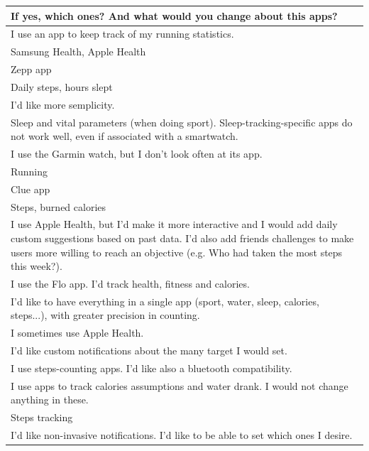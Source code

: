 \documentclass{article}
\begin{document}
\begin{table}[H]
    \centering
    \begin{tabularx}{0.9\textwidth}{X}
        \hline
        \textbf{If yes, which ones? And what would you change about this apps?} \\
        \hline
        I use an app to keep track of my running statistics. \\
        \hline
        Samsung Health, Apple Health \\
        \hline
        Zepp app \\
        \hline
        Daily steps, hours slept \\
        \hline
        I'd like more semplicity. \\
        \hline
        Sleep and vital parameters (when doing sport). Sleep-tracking-specific apps do not work well, even if associated with a smartwatch. \\
        \hline
        I use the Garmin watch, but I don't look often at its app. \\
        \hline
        Running \\
        \hline
        Clue app \\
        \hline
        Steps, burned calories \\
        \hline
        I use Apple Health, but I'd make it more interactive and I would add daily custom suggestions based on past data. I'd also add friends challenges to make users more willing to reach an objective (e.g. Who had taken the most steps this week?). \\
        \hline
        I use the Flo app. I'd track health, fitness and calories. \\
        \hline
        I'd like to have everything in a single app (sport, water, sleep, calories, steps...), with greater precision in counting. \\
        \hline
        I sometimes use Apple Health. \\
        \hline
        I'd like custom notifications about the many target I would set. \\
        \hline
        I use steps-counting apps. I'd like also a bluetooth compatibility. \\
        \hline
        I use apps to track calories assumptions and water drank. I would not change anything in these. \\
        \hline
        Steps tracking \\
        \hline
        I'd like non-invasive notifications. I'd like to be able to set which ones I desire. \\

\end{tabularx}
\end{table}
\end{document}
